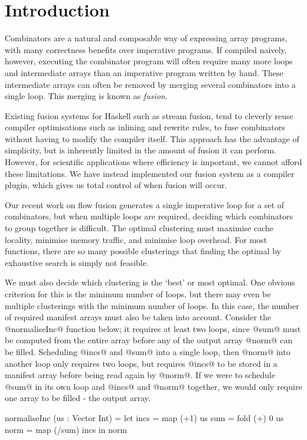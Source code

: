 \section{Introduction}
Combinators are a natural and composable way of expressing array programs, with many correctness benefits over imperative programs.
If compiled naively, however, executing the combinator program will often require many more loops and intermediate arrays than an imperative program written by hand.
These intermediate arrays can often be removed by merging several combinators into a single loop.
This merging is known as \emph{fusion}.

Existing fusion systems for Haskell such as stream fusion\cite{coutts2007streamfusion}, tend to cleverly reuse compiler optimisations such as inlining and rewrite rules, to fuse combinators without having to modify the compiler itself.
This approach has the advantage of simplicity, but is inherently limited in the amount of fusion it can perform.
However, for scientific applications where efficiency is important, we cannot afford these limitations.
We have instead implemented our fusion system as a compiler plugin, which gives us total control of when fusion will occur.

Our recent work on flow fusion\cite{lippmeier2013data} generates a single imperative loop for a set of combinators, but when multiple loops are required, deciding which combinators to group together is difficult.
The optimal clustering must maximise cache locality, minimise memory traffic, and minimise loop overhead.
For most functions, there are so many possible clusterings that finding the optimal by exhaustive search is simply not feasible.

We must also decide which clustering is the `best' or most optimal. 
One obvious criterion for this is the minimum number of loops, but there may even be multiple clusterings with the minimum number of loops.
In this case, the number of required manifest arrays must also be taken into account.
Consider the @normaliseInc@ function below; it requires at least two loops, since @sum@ must be computed from the entire array before any of the output array @norm@ can be filled.
Scheduling @incs@ and @sum@ into a single loop, then @norm@ into another loop only requires two loops, but requires @incs@ to be stored in a manifest array before being read again by @norm@. If we were to schedule @sum@ in its own loop and @incs@ and @norm@ together, we would only require one array to be filled - the output array.

\begin{code}
normaliseInc (us : Vector Int) =
 let incs = map  (+1)    us
     sum  = fold (+) 0   us
     norm = map  (/sum)  incs
 in  norm
\end{code}


